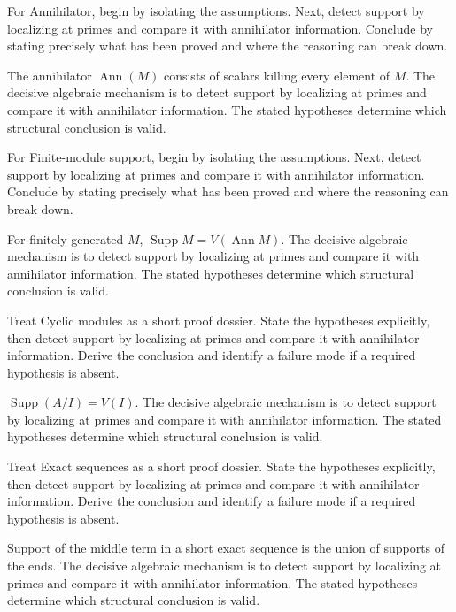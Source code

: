 \begin{problem}\label{prob:v16-problem-02}
For Annihilator, begin by isolating the assumptions. Next, detect support by localizing at primes and compare it with annihilator information. Conclude by stating precisely what has been proved and where the reasoning can break down.
\end{problem}
\begin{solution}
The annihilator $\operatorname{Ann}(M)$ consists of scalars killing every element of $M$. The decisive algebraic mechanism is to detect support by localizing at primes and compare it with annihilator information. The stated hypotheses determine which structural conclusion is valid.
\end{solution}

\begin{problem}\label{prob:v16-problem-03}
For Finite-module support, begin by isolating the assumptions. Next, detect support by localizing at primes and compare it with annihilator information. Conclude by stating precisely what has been proved and where the reasoning can break down.
\end{problem}
\begin{solution}
For finitely generated $M$, $\operatorname{Supp}M=V(\operatorname{Ann}M)$. The decisive algebraic mechanism is to detect support by localizing at primes and compare it with annihilator information. The stated hypotheses determine which structural conclusion is valid.
\end{solution}

\begin{problem}\label{prob:v16-problem-04}
Treat Cyclic modules as a short proof dossier. State the hypotheses explicitly, then detect support by localizing at primes and compare it with annihilator information. Derive the conclusion and identify a failure mode if a required hypothesis is absent.
\end{problem}
\begin{solution}
$\operatorname{Supp}(A/I)=V(I)$. The decisive algebraic mechanism is to detect support by localizing at primes and compare it with annihilator information. The stated hypotheses determine which structural conclusion is valid.
\end{solution}

\begin{problem}\label{prob:v16-problem-05}
Treat Exact sequences as a short proof dossier. State the hypotheses explicitly, then detect support by localizing at primes and compare it with annihilator information. Derive the conclusion and identify a failure mode if a required hypothesis is absent.
\end{problem}
\begin{solution}
Support of the middle term in a short exact sequence is the union of supports of the ends. The decisive algebraic mechanism is to detect support by localizing at primes and compare it with annihilator information. The stated hypotheses determine which structural conclusion is valid.
\end{solution}

